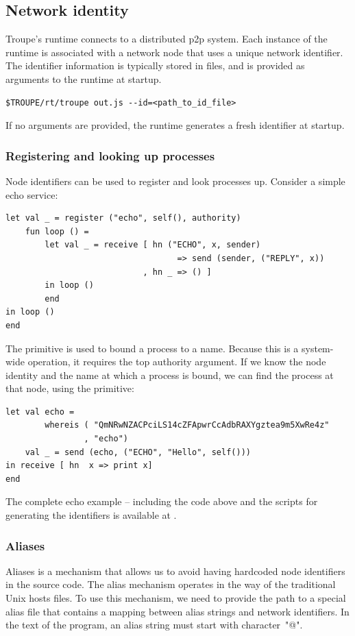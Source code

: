 \subsection{Network identity}
Troupe's runtime connects to a distributed p2p system.
Each instance of the runtime is associated with a network node that uses a
unique network identifier. The identifier information is typically stored in files,
and is provided as arguments to the runtime at startup.
\begin{verbatim}
$TROUPE/rt/troupe out.js --id=<path_to_id_file>
\end{verbatim}
If no arguments are provided, the runtime generates a fresh identifier at startup.


\subsubsection{Registering and looking up processes}

Node identifiers can be used to register and look processes up.
Consider a simple echo service:
\label{example:echo}
\begin{lstlisting}
let val _ = register ("echo", self(), authority)
    fun loop () =
        let val _ = receive [ hn ("ECHO", x, sender)
                                   => send (sender, ("REPLY", x))
                            , hn _ => () ]
        in loop ()
        end
in loop ()
end
\end{lstlisting}
The  primitive is used to bound a process to a name. Because this is a
system-wide operation, it requires the top authority argument.  If we know
the node identity and the name at which a process is bound, we can find the process at that node, using the
 primitive:

\begin{lstlisting}
let val echo =
        whereis ( "QmNRwNZACPciLS14cZFApwrCcAdbRAXYgztea9m5XwRe4z"
                , "echo")
    val _ = send (echo, ("ECHO", "Hello", self()))
in receive [ hn  x => print x]
end
\end{lstlisting}

The complete echo example -- including the code above and
the scripts for generating the identifiers is available at
.


\subsubsection{Aliases}
Aliases is a mechanism that allows us to avoid having hardcoded node identifiers in the source code.
The alias mechanism operates in the way of the traditional Unix hosts files.
To use this mechanism, we need to provide the path to a special alias file that contains a mapping between
alias strings and network identifiers. In the text of the program, an alias string must start with character~"@".

